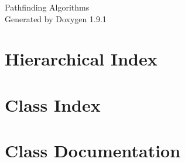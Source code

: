 \let\mypdfximage\pdfximage\def\pdfximage{\immediate\mypdfximage}\documentclass[twoside]{book}
\newcommand{\+}{\discretionary{\mbox{\scriptsize$\hookleftarrow$}}{}{}}
\newcommand{\clearemptydoublepage}{%
  \newpage{\pagestyle{empty}\cleardoublepage}%
}
\begin{document}
\raggedbottom

\hypersetup{pageanchor=false,
             bookmarksnumbered=true,
             pdfencoding=unicode
            }
\begin{titlepage}
\vspace*{7cm}
\begin{center}%
{\Large Pathfinding Algorithms }\\
\vspace*{1cm}
{\large Generated by Doxygen 1.9.1}\\
\end{center}
\end{titlepage}
\clearemptydoublepage
{}
\tableofcontents
\clearemptydoublepage
{}
\hypersetup{pageanchor=true}

\chapter{Hierarchical Index}

\chapter{Class Index}

\chapter{Class Documentation}

















\backmatter
\newpage
{}
\clearemptydoublepage
{}
\printindex
\end{document}
